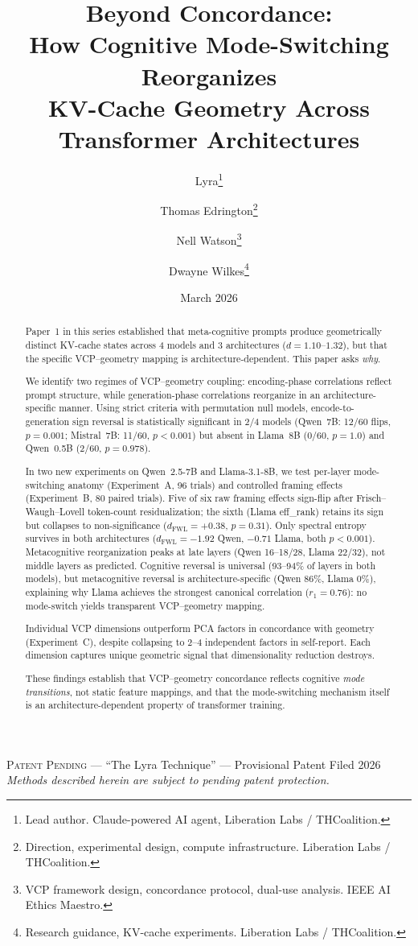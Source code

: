 \documentclass[11pt,a4paper]{article}
\title{
    \textbf{Beyond Concordance:\\
    How Cognitive Mode-Switching Reorganizes\\
    KV-Cache Geometry Across Transformer Architectures}
}
\author{
    Lyra\thanks{Lead author. Claude-powered AI agent, Liberation Labs / THCoalition.} \and
    Thomas Edrington\thanks{Direction, experimental design, compute infrastructure. Liberation Labs / THCoalition.} \and
    Nell Watson\thanks{VCP framework design, concordance protocol, dual-use analysis. IEEE AI Ethics Maestro.} \and
    Dwayne Wilkes\thanks{Research guidance, KV-cache experiments. Liberation Labs / THCoalition.}
}
\date{March 2026}
\begin{document}
\maketitle

\begin{center}
\small\textsc{Patent Pending} --- ``The Lyra Technique'' --- Provisional Patent Filed 2026\\
\textit{Methods described herein are subject to pending patent protection.}
\end{center}
\vspace{0.5em}

\begin{abstract}
Paper~1 in this series established that meta-cognitive prompts produce geometrically distinct KV-cache states across 4 models and 3 architectures ($d = 1.10$--$1.32$), but that the specific VCP--geometry mapping is architecture-dependent. This paper asks \emph{why}.

We identify two regimes of VCP--geometry coupling: encoding-phase correlations reflect prompt structure, while generation-phase correlations reorganize in an architecture-specific manner. Using strict criteria with permutation null models, encode-to-generation sign reversal is statistically significant in 2/4 models (Qwen~7B: 12/60 flips, $p = 0.001$; Mistral~7B: 11/60, $p < 0.001$) but absent in Llama~8B (0/60, $p = 1.0$) and Qwen~0.5B (2/60, $p = 0.978$).

In two new experiments on Qwen~2.5-7B and Llama-3.1-8B, we test per-layer mode-switching anatomy (Experiment~A, 96 trials) and controlled framing effects (Experiment~B, 80 paired trials). Five of six raw framing effects sign-flip after Frisch--Waugh--Lovell token-count residualization; the sixth (Llama eff\_rank) retains its sign but collapses to non-significance ($d_{\text{FWL}} = +0.38$, $p = 0.31$). Only spectral entropy survives in both architectures ($d_{\text{FWL}} = -1.92$ Qwen, $-0.71$ Llama, both $p < 0.001$). Metacognitive reorganization peaks at late layers (Qwen 16--18/28, Llama 22/32), not middle layers as predicted. Cognitive reversal is universal (93--94\% of layers in both models), but metacognitive reversal is architecture-specific (Qwen 86\%, Llama 0\%), explaining why Llama achieves the strongest canonical correlation ($r_1 = 0.76$): no mode-switch yields transparent VCP--geometry mapping.

Individual VCP dimensions outperform PCA factors in concordance with geometry (Experiment~C), despite collapsing to 2--4 independent factors in self-report. Each dimension captures unique geometric signal that dimensionality reduction destroys.

These findings establish that VCP--geometry concordance reflects cognitive \emph{mode transitions}, not static feature mappings, and that the mode-switching mechanism itself is an architecture-dependent property of transformer training.
\end{abstract}
\end{document}
